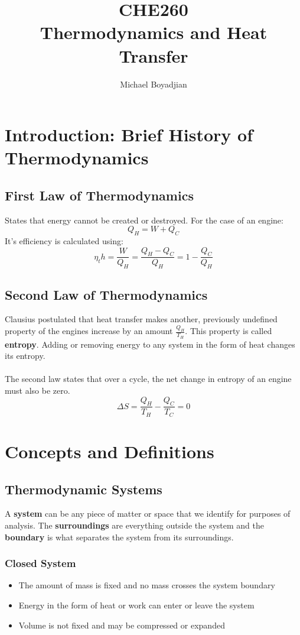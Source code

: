 \documentclass[11pt]{article}
\begin{document}
\title{CHE260 \\ Thermodynamics and Heat Transfer}
\author{Michael Boyadjian}
\maketitle
\pagebreak

\tableofcontents

\pagebreak

\section{Introduction: Brief History of Thermodynamics}
\subsection{First Law of Thermodynamics}
States that energy cannot be created or destroyed. For the case of an engine:
$$ Q_H = W + Q_C$$
It's efficiency is calculated using:
$$ \eta_th = \frac{W}{Q_H} =  \frac{Q_H - Q_C}{Q_H} = 1 - \frac{Q_C}{Q_H}$$
\subsection{Second Law of Thermodynamics}
Clausius postulated that heat transfer makes another, previously undefined property of the engines increase by an amount $\frac{Q_H}{T_H}$. This property is called \textbf{entropy}. Adding or removing energy to any system in the form of heat changes its entropy. \\ \\
The second law states that over a cycle, the net change in entropy of an engine must also be zero.
$$\Delta S = \frac{Q_H}{T_H} - \frac{Q_C}{T_C} = 0$$
\pagebreak
\section{Concepts and Definitions}
\subsection{Thermodynamic Systems}
A \textbf{system} can be any piece of matter or space that we identify for purposes of analysis. The \textbf{surroundings} are everything outside the system and the \textbf{boundary} is what separates the system from its surroundings.
\subsubsection{Closed System}
\begin{itemize}
\item The amount of mass is fixed and no mass crosses the system boundary
\item Energy in the form of heat or work can enter or leave the system
\item Volume is not fixed and may be compressed or expanded
\end{itemize}
\end{document}
